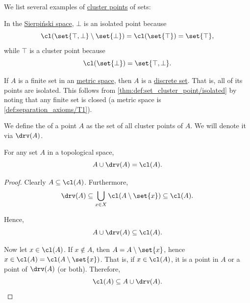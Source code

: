 \begin{example}\label{ex:def:set_cluster_point}
  We list several examples of \hyperref[def:set_cluster_point]{cluster points} of sets:
  \begin{thmenum}
     In the \hyperref[def:sierpinski_space]{Sierpi\'nski space}, \( \bot \) is an isolated point because
    \begin{equation*}
      \cl(\set{ \top, \bot } \setminus \set{ \bot }) = \cl(\set{ \top }) = \set{ \top },
    \end{equation*}
    while \( \top \) is a cluster point because
    \begin{equation*}
      \cl(\set{ \bot }) = \set{ \top, \bot }.
    \end{equation*}

     If \( A \) is a finite set in an \hyperref[def:metric_space]{metric space}, then \( A \) is a \hyperref[thm:def:set_cluster_point/discrete]{discrete set}. That is, all of its points are isolated. This follows from \cref{thm:def:set_cluster_point/isolated} by noting that any finite set is closed (a metric space is \ref{def:separation_axioms/T1}).
  \end{thmenum}
\end{example}

\begin{definition}\label{def:derived_set}
  We define the  of a point \( A \) as the set of all cluster points of \( A \). We will denote it via \( \drv(A) \).
\end{definition}

\begin{proposition}\label{thm:union_with_derived_set}
  For any set \( A \) in a topological space,
  \begin{equation*}
    A \cup \drv(A) = \cl(A).
  \end{equation*}
\end{proposition}
\begin{proof}
  Clearly \( A \subseteq \cl(A) \). Furthermore,
  \begin{equation*}
    \drv(A) \subseteq \bigcup_{x \in X} \cl(A \setminus \set{ x }) \subseteq \cl(A).
  \end{equation*}

  Hence,
  \begin{equation*}
    A \cup \drv(A) \subseteq \cl(A).
  \end{equation*}

  Now let \( x \in \cl(A) \). If \( x \notin A \), then \( A = A \setminus \set{ x } \), hence \( x \in \cl(A) = \cl(A \setminus \set{ x }) \). That is, if \( x \in \cl(A) \), it is a point in \( A \) or a point of \( \drv(A) \) (or both). Therefore,
  \begin{equation*}
    \cl(A) \subseteq A \cup \drv(A).
  \end{equation*}
\end{proof}

